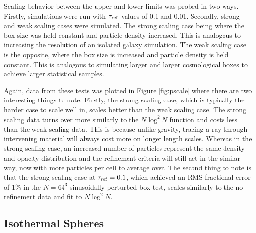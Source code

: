 \documentclass[fleq,usenatbib]{mnras}
\newcommand{\tr}{\tau_{\rm ref}}
\begin{document}
Scaling behavior between the upper and lower limits was probed in two ways. 
Firstly, simulations were run with $\tr$ values of 0.1 and 0.01. Secondly, 
strong and weak scaling cases were simulated. The strong scaling case being 
where the box size was held constant and particle density increased. This is 
analogous to increasing the resolution of an isolated galaxy simulation. The 
weak scaling case is the opposite, where the box size is increased and 
particle density is held constant. This is analogous to simulating larger and 
larger cosmological boxes to achieve larger statistical samples. 

Again, data from these tests was plotted in Figure \ref{fig:pscale} where 
there are two interesting things to note. Firstly, the strong scaling case, 
which is typically the harder case to scale well in, scales better than the 
weak scaling case. The strong scaling data turns over more similarly to the
$N\log^2{N}$ function and costs less than the weak scaling data. This is 
because unlike gravity, tracing a ray through intervening material will always 
cost more on longer length scales. Whereas in the strong scaling case, an 
increased number of particles represent the same density and opacity 
distribution and the refinement criteria will still act in the similar way, 
now with more particles per cell to average over. The second thing to note is 
that the strong scaling case at $\tr=0.1$, which achieved an RMS fractional 
error of 1\% in the $N=64^3$ sinusoidally perturbed box test, scales 
similarly to the no refinement data and fit to $N\log^2{N}$. 

\subsection{Isothermal Spheres}
\end{document}
